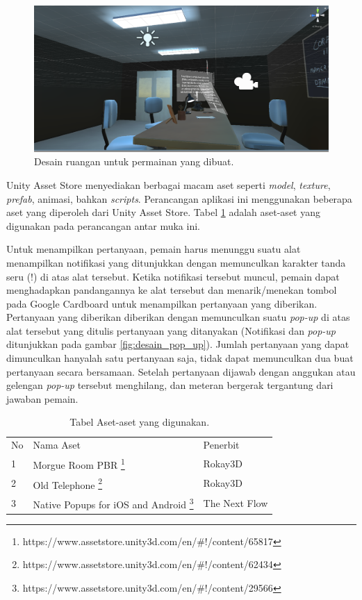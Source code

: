 \begin{figure}[htbp]
\centering
\includegraphics[scale=0.3]{Gambar/Desain-ruangan.PNG}
\caption{Desain ruangan untuk permainan yang dibuat.}
\label{fig:gambar_desain_ruangan}
\end{figure}

Unity Asset Store menyediakan berbagai macam aset seperti \textit{model}, \textit{texture}, \textit{prefab}, animasi, bahkan \textit{scripts}. Perancangan aplikasi ini menggunakan beberapa aset yang diperoleh dari Unity Asset Store. Tabel \ref{tab:tabel_aset_yang_digunakan} adalah aset-aset yang digunakan pada perancangan antar muka ini.

Untuk menampilkan pertanyaan, pemain harus menunggu suatu alat menampilkan notifikasi yang ditunjukkan dengan memunculkan karakter tanda seru (!) di atas alat tersebut. Ketika notifikasi tersebut muncul, pemain dapat menghadapkan pandangannya ke alat tersebut dan menarik/menekan tombol pada Google Cardboard untuk menampilkan pertanyaan yang diberikan. Pertanyaan yang diberikan diberikan dengan memunculkan suatu \textit{pop-up} di atas alat tersebut yang ditulis pertanyaan yang ditanyakan (Notifikasi dan \textit{pop-up} ditunjukkan pada gambar \ref{fig:desain_pop_up}). Jumlah pertanyaan yang dapat dimunculkan hanyalah satu pertanyaan saja, tidak dapat memunculkan dua buat pertanyaan secara bersamaan. Setelah pertanyaan dijawab dengan anggukan atau gelengan \textit{pop-up} tersebut menghilang, dan meteran bergerak tergantung dari jawaban pemain.

\begin{table}[htbp]
    \centering
    \begin{tabular}{|p{1cm}||p{6cm}|p{6cm}|}
    \hline\\
    \hline
       No & Nama Aset & Penerbit \\
    \hline
        1 &  Morgue Room PBR \footnote{https://www.assetstore.unity3d.com/en/\#!/content/65817} & Rokay3D\\
    \hline
        2 &  Old Telephone \footnote{https://www.assetstore.unity3d.com/en/\#!/content/62434} & Rokay3D\\
    \hline
        3 &  Native Popups for iOS and Android \footnote{https://www.assetstore.unity3d.com/en/\#!/content/29566} & The Next Flow\\
    \hline
    \end{tabular}
    \caption{Tabel Aset-aset yang digunakan.}
    \label{tab:tabel_aset_yang_digunakan}
\end{table}

